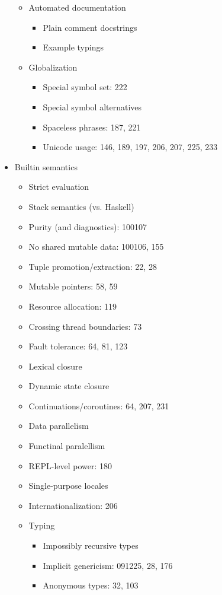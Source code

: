 \begin{itemize}
\begin{itemize}
  \item Automated documentation
    \begin{itemize}
    \item Plain comment docstrings
    \item Example typings
    \end{itemize}
  \item Globalization
    \begin{itemize}
    \item Special symbol set: 222
    \item Special symbol alternatives
    \item Spaceless phrases: 187, 221
    \item Unicode usage: 146, 189, 197, 206, 207, 225, 233
    \end{itemize}
  \end{itemize}
\item Builtin semantics
  \begin{itemize}
  \item Strict evaluation
  \item Stack semantics (vs. Haskell)
  \item Purity (and diagnostics): 100107
  \item No shared mutable data: 100106, 155
  \item Tuple promotion/extraction: 22, 28
  \item Mutable pointers: 58, 59
  \item Resource allocation: 119
  \item Crossing thread boundaries: 73
  \item Fault tolerance: 64, 81, 123
  \item Lexical closure
  \item Dynamic state closure
  \item Continuations/coroutines: 64, 207, 231
  \item Data parallelism
  \item Functinal paralellism
  \item REPL-level power: 180
  \item Single-purpose locales
  \item Internationalization: 206
  \item Typing
    \begin{itemize}
    \item Impossibly recursive types
    \item Implicit genericism: 091225, 28, 176
    \item Anonymous types: 32, 103

\end{itemize}
\end{itemize}
\end{itemize}

